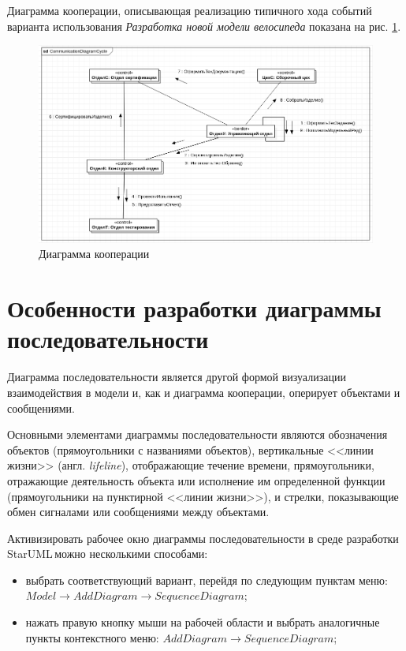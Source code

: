 \documentclass[a4paper,12pt]{extreport}
\newcommand{\staruml}{StarUML\,\tm}
\begin{document}
Диаграмма кооперации, описывающая реализацию типичного хода событий варианта использования \textit{Разработка новой модели велосипеда} показана на рис. \ref{fig:communication}.

\begin{figure}[h!]
	\centering
	\includegraphics[width=1\linewidth]{images/communication}
	\caption{Диаграмма кооперации}
	\label{fig:communication}
\end{figure}

\section{Особенности разработки диаграммы последовательности}
Диаграмма последовательности является другой формой визуализации взаимодействия в модели и, как и диаграмма кооперации, оперирует объектами и сообщениями.

Основными элементами диаграммы последовательности являются обозначения объектов (прямоугольники с названиями объектов), вертикальные
<<линии жизни>> (англ. \textit{lifeline}), отображающие течение времени, прямоугольники, отражающие деятельность объекта или исполнение им определенной функции (прямоугольники на пунктирной <<линии жизни>>), и стрелки, показывающие обмен сигналами или сообщениями между объектами.

Активизировать рабочее окно диаграммы последовательности в среде разработки \staruml можно несколькими способами:
\begin{itemize}
	\item выбрать соответствующий вариант, перейдя по следующим пунктам меню: \\$Model \to Add Diagram \to Sequence Diagram$;
	\item нажать правую кнопку мыши на рабочей области и выбрать аналогичные пункты контекстного меню: $Add Diagram \to Sequence Diagram$;
\end{itemize}
\end{document}
